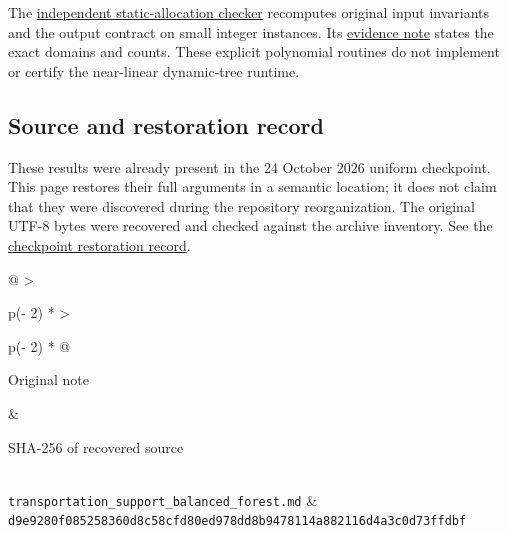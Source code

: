 The \href{https://github.com/icekylinx/algorithm-frontier/blob/main/manuscripts/graph-backends/verify/check_static_allocations.py}{independent static-allocation checker} recomputes original input invariants and the output contract on small integer instances. Its \href{https://github.com/icekylinx/algorithm-frontier/blob/main/manuscripts/graph-backends/verify/README.md\#independent-flow-and-transportation-checks}{evidence note} states the exact domains and counts. These explicit polynomial routines do not implement or certify the near-linear dynamic-tree runtime.

\hypertarget{af-c467a6f0ad-source-and-restoration-record}{%
\subsection{Source and restoration record}\label{af-c467a6f0ad-source-and-restoration-record}}

These results were already present in the 24 October 2026 uniform checkpoint. This page restores their full arguments in a semantic location; it does not claim that they were discovered during the repository reorganization. The original UTF-8 bytes were recovered and checked against the archive inventory. See the \href{https://github.com/icekylinx/algorithm-frontier/blob/main/provenance/checkpoint-restoration.md}{checkpoint restoration record}.

\begin{longtable}[]{@{}
  >{\raggedright\arraybackslash}p{(\columnwidth - 2\tabcolsep) * }
  >{\raggedright\arraybackslash}p{(\columnwidth - 2\tabcolsep) * }@{}}
\toprule\noalign{}
\begin{minipage}[b]{\linewidth}\raggedright
Original note
\end{minipage} & \begin{minipage}[b]{\linewidth}\raggedright
SHA-256 of recovered source
\end{minipage} \\
\midrule\noalign{}
\endhead
\bottomrule\noalign{}
\endlastfoot
\texttt{transportation\_support\_balanced\_forest.md} & \texttt{d9e9280f085258360d8c58cfd80ed978dd8b9478114a882116d4a3c0d73ffdbf} \\
\end{longtable}
